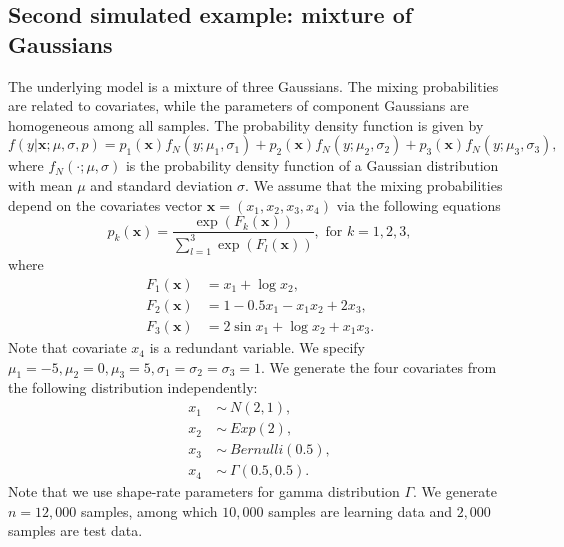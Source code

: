 \documentclass[11pt]{article}
\numberwithin{equation}{section}
\def\bx{\boldsymbol{x}}
\begin{document}
\subsection{Second simulated example: mixture of Gaussians}

The underlying model is a mixture of three Gaussians. The mixing probabilities are related to covariates, while the parameters of component Gaussians are homogeneous among all samples.
The probability density function is given by
\begin{equation}\label{gaussian-true}
f(y|\bx; \mu,\sigma,p)=p_1(\bx)f_N(y;\mu_1,\sigma_1)+p_2(\bx)f_N(y;\mu_2,\sigma_2)+p_3(\bx)f_N(y;\mu_3,\sigma_3),
\end{equation}
where $f_N(\cdot;\mu,\sigma)$ is the probability density function of a Gaussian distribution with mean $\mu$ and standard deviation $\sigma$.
We assume that the mixing probabilities depend on the covariates vector $\bx=(x_1,x_2,x_3,x_4)$ via the following equations
\begin{equation}\label{logistic-ex}
	p_k(\bx)=\frac{\exp\left(F_k(\bx)\right)}{\sum_{l=1}^{3}\exp\left(F_l(\bx)\right)}, \text{ for } k=1,2,3,
\end{equation}
where 
\begin{align*}
F_1(\bx)&=x_1+\log x_2,\\
 F_2(\bx)&=1-0.5x_1-x_1x_2+2x_3, \\
  F_3(\bx)&=2\sin x_1+\log x_2 + x_1x_3.
	\end{align*}
Note that covariate $x_4$ is a redundant variable.
We specify $\mu_1=-5,\mu_2=0,\mu_3=5, \sigma_1=\sigma_2=\sigma_3=1$. We generate the four covariates from the following distribution independently:
   \begin{align*}
   	x_1~&\sim~ N(2,1),\\
   	x_2~&\sim~ Exp(2), \\
   	x_3~&\sim~ Bernulli(0.5), \\
   	x_4~&\sim~ \Gamma(0.5,0.5).
   \end{align*}
Note that we use shape-rate parameters for gamma distribution $\Gamma$.
We generate $n=12,000$ samples, among which $10,000$ samples are learning data and $2,000$ samples are test data.
\end{document}
